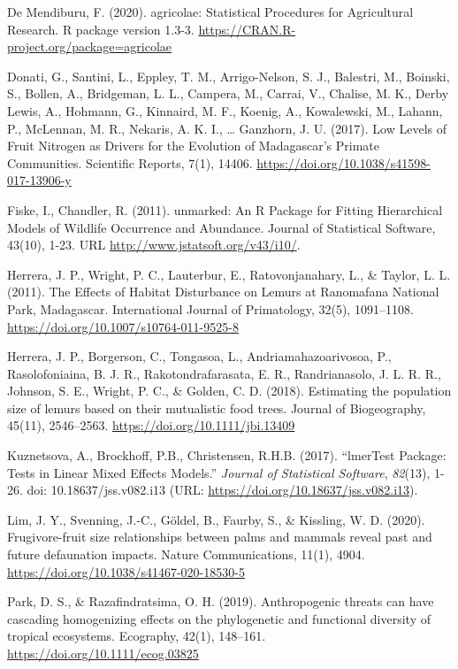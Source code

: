 \documentclass[
  12pt,
]{article}
\begin{document}
De Mendiburu, F. (2020). agricolae: Statistical Procedures for
Agricultural Research. R package version 1.3-3.
\url{https://CRAN.R-project.org/package=agricolae}

Donati, G., Santini, L., Eppley, T. M., Arrigo-Nelson, S. J., Balestri,
M., Boinski, S., Bollen, A., Bridgeman, L. L., Campera, M., Carrai, V.,
Chalise, M. K., Derby Lewis, A., Hohmann, G., Kinnaird, M. F., Koenig,
A., Kowalewski, M., Lahann, P., McLennan, M. R., Nekaris, A. K. I.,
\ldots{} Ganzhorn, J. U. (2017). Low Levels of Fruit Nitrogen as Drivers
for the Evolution of Madagascar's Primate Communities. Scientific
Reports, 7(1), 14406. \url{https://doi.org/10.1038/s41598-017-13906-y}

Fiske, I., Chandler, R. (2011). unmarked: An R Package for Fitting
Hierarchical Models of Wildlife Occurrence and Abundance. Journal of
Statistical Software, 43(10), 1-23. URL
\url{http://www.jstatsoft.org/v43/i10/}.

Herrera, J. P., Wright, P. C., Lauterbur, E., Ratovonjanahary, L., \&
Taylor, L. L. (2011). The Effects of Habitat Disturbance on Lemurs at
Ranomafana National Park, Madagascar. International Journal of
Primatology, 32(5), 1091--1108.
\url{https://doi.org/10.1007/s10764-011-9525-8}

Herrera, J. P., Borgerson, C., Tongasoa, L., Andriamahazoarivosoa, P.,
Rasolofoniaina, B. J. R., Rakotondrafarasata, E. R., Randrianasolo, J.
L. R. R., Johnson, S. E., Wright, P. C., \& Golden, C. D. (2018).
Estimating the population size of lemurs based on their mutualistic food
trees. Journal of Biogeography, 45(11), 2546--2563.
\url{https://doi.org/10.1111/jbi.13409}

Kuznetsova, A., Brockhoff, P.B., Christensen, R.H.B. (2017). ``lmerTest
Package: Tests in Linear Mixed Effects Models.'' \emph{Journal of
Statistical Software}, \emph{82}(13), 1-26. doi: 10.18637/jss.v082.i13
(URL: \url{https://doi.org/10.18637/jss.v082.i13}).

Lim, J. Y., Svenning, J.-C., Göldel, B., Faurby, S., \& Kissling, W. D.
(2020). Frugivore-fruit size relationships between palms and mammals
reveal past and future defaunation impacts. Nature Communications,
11(1), 4904. \url{https://doi.org/10.1038/s41467-020-18530-5}

Park, D. S., \& Razafindratsima, O. H. (2019). Anthropogenic threats can
have cascading homogenizing effects on the phylogenetic and functional
diversity of tropical ecosystems. Ecography, 42(1), 148--161.
\url{https://doi.org/10.1111/ecog.03825}
\end{document}
